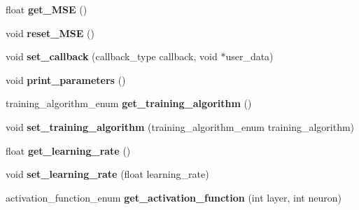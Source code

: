 \begin{DoxyCompactItemize}
\item 
\hypertarget{class_f_a_n_n_1_1neural__net_a2b54992b5610f7deece961cd5d9348e7}{float {\bfseries get\-\_\-\-M\-S\-E} ()}\label{class_f_a_n_n_1_1neural__net_a2b54992b5610f7deece961cd5d9348e7}

\item 
\hypertarget{class_f_a_n_n_1_1neural__net_a0180935283849e7e505d2d4399d2e3e2}{void {\bfseries reset\-\_\-\-M\-S\-E} ()}\label{class_f_a_n_n_1_1neural__net_a0180935283849e7e505d2d4399d2e3e2}

\item 
\hypertarget{class_f_a_n_n_1_1neural__net_a71f3364c281e0a540daafb37a8be2be6}{void {\bfseries set\-\_\-callback} (callback\-\_\-type callback, void $\ast$user\-\_\-data)}\label{class_f_a_n_n_1_1neural__net_a71f3364c281e0a540daafb37a8be2be6}

\item 
\hypertarget{class_f_a_n_n_1_1neural__net_accc18214ab34354b34c0d6189223e66f}{void {\bfseries print\-\_\-parameters} ()}\label{class_f_a_n_n_1_1neural__net_accc18214ab34354b34c0d6189223e66f}

\item 
\hypertarget{class_f_a_n_n_1_1neural__net_a2beba7b5f6f4360bf87aa09cb096224f}{training\-\_\-algorithm\-\_\-enum {\bfseries get\-\_\-training\-\_\-algorithm} ()}\label{class_f_a_n_n_1_1neural__net_a2beba7b5f6f4360bf87aa09cb096224f}

\item 
\hypertarget{class_f_a_n_n_1_1neural__net_aedd72c51bcf3a597e214bc479c797cee}{void {\bfseries set\-\_\-training\-\_\-algorithm} (training\-\_\-algorithm\-\_\-enum training\-\_\-algorithm)}\label{class_f_a_n_n_1_1neural__net_aedd72c51bcf3a597e214bc479c797cee}

\item 
\hypertarget{class_f_a_n_n_1_1neural__net_a9305550096662b9d7752875ef5bd7241}{float {\bfseries get\-\_\-learning\-\_\-rate} ()}\label{class_f_a_n_n_1_1neural__net_a9305550096662b9d7752875ef5bd7241}

\item 
\hypertarget{class_f_a_n_n_1_1neural__net_aa2c215b29f3da96a4bdf1356d3310842}{void {\bfseries set\-\_\-learning\-\_\-rate} (float learning\-\_\-rate)}\label{class_f_a_n_n_1_1neural__net_aa2c215b29f3da96a4bdf1356d3310842}

\item 
\hypertarget{class_f_a_n_n_1_1neural__net_ae63517636d516041febb59ee044b8490}{activation\-\_\-function\-\_\-enum {\bfseries get\-\_\-activation\-\_\-function} (int layer, int neuron)}\label{class_f_a_n_n_1_1neural__net_ae63517636d516041febb59ee044b8490}


\end{DoxyCompactItemize}
